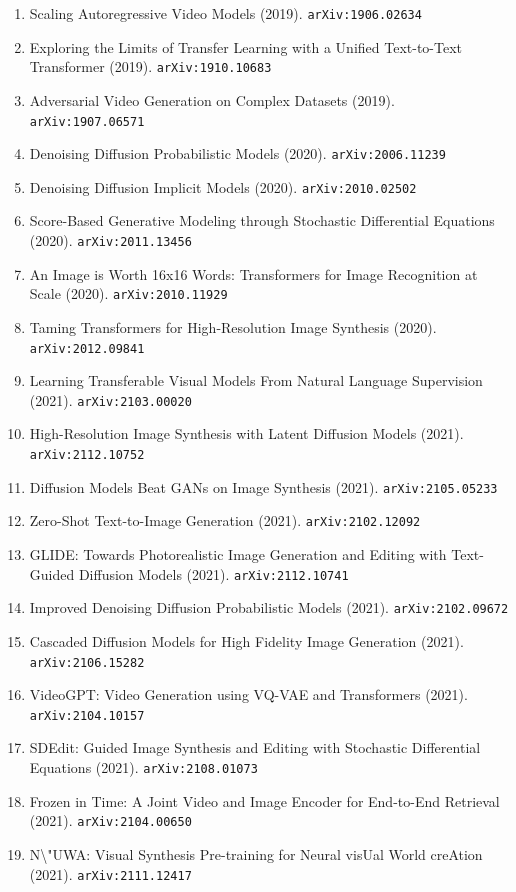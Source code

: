 \documentclass[11pt]{article}
\begin{document}
\begin{enumerate}
  \item Scaling Autoregressive Video Models (2019). \texttt{arXiv:1906.02634}
  \item Exploring the Limits of Transfer Learning with a Unified Text-to-Text
  Transformer (2019). \texttt{arXiv:1910.10683}
  \item Adversarial Video Generation on Complex Datasets (2019). \texttt{arXiv:1907.06571}
  \item Denoising Diffusion Probabilistic Models (2020). \texttt{arXiv:2006.11239}
  \item Denoising Diffusion Implicit Models (2020). \texttt{arXiv:2010.02502}
  \item Score-Based Generative Modeling through Stochastic Differential
  Equations (2020). \texttt{arXiv:2011.13456}
  \item An Image is Worth 16x16 Words: Transformers for Image Recognition at
  Scale (2020). \texttt{arXiv:2010.11929}
  \item Taming Transformers for High-Resolution Image Synthesis (2020). \texttt{arXiv:2012.09841}
  \item Learning Transferable Visual Models From Natural Language Supervision (2021). \texttt{arXiv:2103.00020}
  \item High-Resolution Image Synthesis with Latent Diffusion Models (2021). \texttt{arXiv:2112.10752}
  \item Diffusion Models Beat GANs on Image Synthesis (2021). \texttt{arXiv:2105.05233}
  \item Zero-Shot Text-to-Image Generation (2021). \texttt{arXiv:2102.12092}
  \item GLIDE: Towards Photorealistic Image Generation and Editing with
  Text-Guided Diffusion Models (2021). \texttt{arXiv:2112.10741}
  \item Improved Denoising Diffusion Probabilistic Models (2021). \texttt{arXiv:2102.09672}
  \item Cascaded Diffusion Models for High Fidelity Image Generation (2021). \texttt{arXiv:2106.15282}
  \item VideoGPT: Video Generation using VQ-VAE and Transformers (2021). \texttt{arXiv:2104.10157}
  \item SDEdit: Guided Image Synthesis and Editing with Stochastic Differential
  Equations (2021). \texttt{arXiv:2108.01073}
  \item Frozen in Time: A Joint Video and Image Encoder for End-to-End Retrieval (2021). \texttt{arXiv:2104.00650}
  \item N\textbackslash{}"UWA: Visual Synthesis Pre-training for Neural visUal World creAtion (2021). \texttt{arXiv:2111.12417}

\end{enumerate}
\end{document}
